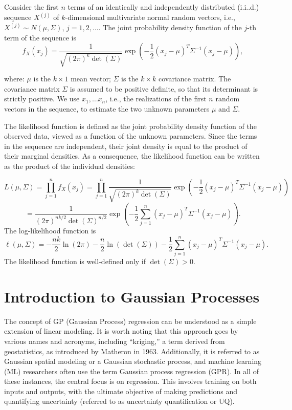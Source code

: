 \documentclass[
  letterpaper,
  DIV=11,
  numbers=noendperiod]{scrreprt}
\begin{document}
Consider the first \(n\) terms of an identically and independently
distributed (i.i..d.) sequence \({X^{(j)}}\) of \(k\)-dimensional
multivariate normal random vectors, i.e.,
\(X^{(j)} \sim N(\mu, \Sigma)\), \(j=1,2,\ldots\). The joint probability
density function of the \(j\)-th term of the sequence is \[
f_X(x_j) = \frac{1}{\sqrt{(2\pi)^k \det(\Sigma)}} \exp\left(-\frac{1}{2} (x_j-\mu)^T\Sigma^{-1} (x_j-\mu)\right),
\]

where: \(\mu\) is the \(k \times 1\) mean vector; \(\Sigma\) is the
\(k \times k\) covariance matrix. The covariance matrix \(\Sigma\) is
assumed to be positive definite, so that its determinant is strictly
positive. We use \(x_1, \ldots x_n\), i.e., the realizations of the
first \(n\) random vectors in the sequence, to estimate the two unknown
parameters \(\mu\) and \(\Sigma\).

The likelihood function is defined as the joint probability density
function of the observed data, viewed as a function of the unknown
parameters. Since the terms in the sequence are independent, their joint
density is equal to the product of their marginal densities. As a
consequence, the likelihood function can be written as the product of
the individual densities:

\[
L(\mu, \Sigma) = \prod_{j=1}^n f_X(x_j) = \prod_{j=1}^n \frac{1}{\sqrt{(2\pi)^k \det(\Sigma)}} \exp\left(-\frac{1}{2} (x_j-\mu)^T\Sigma^{-1} (x_j-\mu)\right)
\] \[
= \frac{1}{(2\pi)^{nk/2} \det(\Sigma)^{n/2}} \exp\left(-\frac{1}{2} \sum_{j=1}^n (x_j-\mu)^T\Sigma^{-1} (x_j-\mu)\right).
\] The log-likelihood function is \[
\ell(\mu, \Sigma) = -\frac{nk}{2} \ln(2\pi) - \frac{n}{2} \ln(\det(\Sigma)) - \frac{1}{2} \sum_{j=1}^n (x_j-\mu)^T\Sigma^{-1} (x_j-\mu).
\] The likelihood function is well-defined only if \(\det(\Sigma)>0\).

\hypertarget{introduction-to-gaussian-processes}{%
\section{Introduction to Gaussian
Processes}\label{introduction-to-gaussian-processes}}

The concept of GP (Gaussian Process) regression can be understood as a
simple extension of linear modeling. It is worth noting that this
approach goes by various names and acronyms, including ``kriging,'' a
term derived from geostatistics, as introduced by Matheron in 1963.
Additionally, it is referred to as Gaussian spatial modeling or a
Gaussian stochastic process, and machine learning (ML) researchers often
use the term Gaussian process regression (GPR). In all of these
instances, the central focus is on regression. This involves training on
both inputs and outputs, with the ultimate objective of making
predictions and quantifying uncertainty (referred to as uncertainty
quantification or UQ).
\end{document}
